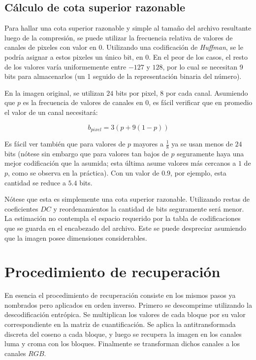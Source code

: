 \documentclass[%
final,
%
reprint,
%
notitlepage,
narroweqnarray,
inline,
twoside,
invited
]{ieee}
\begin{document}
\subsection{Cálculo de cota superior razonable}

\par Para hallar una cota superior razonable y simple al tamaño del archivo resultante luego de la compresión,
 se puede 
utilizar la frecuencia relativa de valores de canales de pixeles con valor en 0. 
Utilizando una codificación de \textit{Huffman}, 
se le podría asignar a estos pixeles un único bit, en 0. En el peor de los casos, el resto de los valores 
varía uniformemente entre $-127$ y $128$, por lo cual se necesitan 9 bits para almacenarlos (un 1 seguido 
de la representación binaria del número).
\par En la imagen original, se utilizan $24$ bits por pixel, $8$ por cada canal. Asumiendo que $p$ es la frecuencia 
de valores de canales en 0, es fácil verificar que en promedio el valor de un canal necesitará:

\begin{equation}
b_{pixel}=3(p+9(1-p))
\end{equation}

\par Es fácil ver también que para valores de $p$ mayores a $\frac{1}{8}$ ya se usan menos de $24$ bits (nótese sin 
embargo que para valores tan bajos de $p$ seguramente haya una mejor codificación que la asumida; esta última asume 
valores más cercanos a $1$ de $p$, como se observa en la práctica). Con un valor de $0.9$, por ejemplo, esta cantidad 
se reduce a $5.4$ bits.
\par Nótese que esta es simplemente una cota superior razonable. Utilizando restas de coeficientes $DC$ y reordenamientos 
la cantidad de bits seguramente será menor. La estimación no contempla el espacio requerido por la tabla de codificaciones 
que se guarda en el encabezado del archivo. Este se puede despreciar asumiendo que la imagen posee dimensiones considerables.



\section{Procedimiento de recuperación}

En esencia el procedimiento de recuperación consiste en los mismos pasos ya nombrados pero aplicados 
en orden inverso. Primero se descomprime utilizando la descodificación entrópica. Se multiplican 
los valores de cada bloque por su valor correspondiente en la matriz de cuantificación. Se aplica la 
antitransformada discreta del coseno a cada bloque, y luego se recupera la imagen en los canales luma y croma 
con los bloques. Finalmente se transforman dichos canales a los canales $RGB$.
\end{document}
